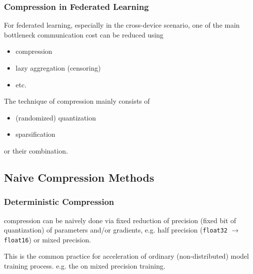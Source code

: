 \begin{frame}
\frametitle{Compression in Federated Learning}

For federated learning, especially in the cross-device scenario, one of the main bottleneck {\color{red} communication cost} can be reduced using
\begin{itemize}
    \item compression
    \item {lazy aggregation (censoring)}
    \item {etc.}
\end{itemize}

\pause
\vspace{0.6em}

The technique of compression mainly consists of
\begin{itemize}
    \item (randomized) quantization
    \item sparsification
\end{itemize}
or their combination.

\end{frame}


\subsection{Naive Compression Methods}


\begin{frame}
\frametitle{Deterministic Compression}

compression can be naively done via fixed reduction of precision (fixed bit of quantization) of parameters and/or gradients, e.g. {\color{red} half precision} (\texttt{float32} $\to$ \texttt{float16}) or {\color{red} mixed precision}.

\vspace{0.6em}

This is the common practice for acceleration of ordinary (non-distributed) model training process. e.g. the \href{https://pytorch.org/blog/accelerating-training-on-nvidia-gpus-with-pytorch-automatic-mixed-precision/}{} on mixed precision training.

\end{frame}

